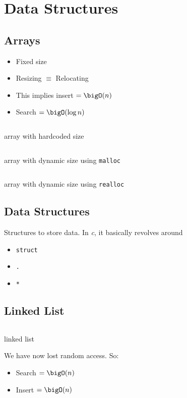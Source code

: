 \chapter{Data Structures}
\section{Arrays}
\begin{itemize}
	\item Fixed size
	\item Resizing $\equiv$ Relocating
	\item This implies insert $= \bigO(n)$
	\item Search $= \bigO(\log n)$
\end{itemize}
\begin{code}
	\inputminted{c}{codes/src5/list0.c}
	\caption{array with hardcoded size}
\end{code}
\begin{code}
	\inputminted{c}{codes/src5/list1.c}
	\caption{array with dynamic size using \texttt{malloc}}
\end{code}
\begin{code}
	\inputminted{c}{codes/src5/list2.c}
	\caption{array with dynamic size using \texttt{realloc}}
\end{code}

\section{Data Structures}
Structures to store data. In \emph{c}, it basically revolves around
\begin{itemize}
	\item \texttt{struct}
	\item \texttt{.}
	\item \texttt{*}
\end{itemize}

\section{Linked List}
\begin{code}
	\inputminted{c}{codes/src5/list3.c}
	\caption{linked list}
\end{code}
We have now lost random access. So:
\begin{itemize}
	\item Search $= \bigO(n)$
	\item Insert $= \bigO(n)$
\end{itemize}

